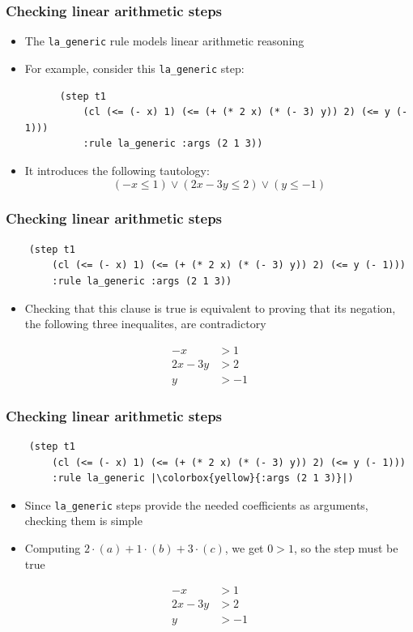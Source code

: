 \documentclass[usepdftitle=false,aspectratio=169]{beamer}
\newcommand\vitem{\vfill\item}
\begin{document}
\begin{frame}[fragile]
  \frametitle{Checking linear arithmetic steps}
  \begin{itemize}
    \item The \texttt{la\_generic} rule models linear arithmetic reasoning
    \vitem For example, consider this \texttt{la\_generic} step:
    \begin{verbatim}
      (step t1
          (cl (<= (- x) 1) (<= (+ (* 2 x) (* (- 3) y)) 2) (<= y (- 1)))
          :rule la_generic :args (2 1 3))
    \end{verbatim}
    \vitem It introduces the following tautology:
    $$(-x \leq 1) \lor (2x - 3y \leq 2) \lor (y \leq -1)$$
  \end{itemize}
\end{frame}

\begin{frame}[t, fragile]
  \frametitle{Checking linear arithmetic steps}
  \begin{verbatim}
    (step t1
        (cl (<= (- x) 1) (<= (+ (* 2 x) (* (- 3) y)) 2) (<= y (- 1)))
        :rule la_generic :args (2 1 3))
  \end{verbatim}
  \begin{itemize}
    \item Checking that this clause is true is equivalent to proving that its
    negation, the following three inequalites, are contradictory
  \end{itemize}
  \begin{align*}
    -x &> 1\tag{a}\\
    2x - 3y &> 2\tag{b}\\
    y &> -1\tag{c}
  \end{align*}
\end{frame}
\addtocounter{framenumber}{-1}

\begin{frame}[t, fragile]
  \frametitle{Checking linear arithmetic steps}
  \begin{verbatim}
    (step t1
        (cl (<= (- x) 1) (<= (+ (* 2 x) (* (- 3) y)) 2) (<= y (- 1)))
        :rule la_generic |\colorbox{yellow}{:args (2 1 3)}|)
  \end{verbatim}
  \begin{itemize}
    \item Since \texttt{la\_generic} steps provide the needed coefficients as
    arguments, checking them is simple
    \vitem Computing $2 \cdot (a) + 1 \cdot (b) + 3 \cdot (c)$, we get $0 > 1$,
    so the step must be true
  \end{itemize}
  \begin{align*}
    -x &> 1\tag{a}\\
    2x - 3y &> 2\tag{b}\\
    y &> -1\tag{c}
  \end{align*}
\end{frame}
\end{document}
